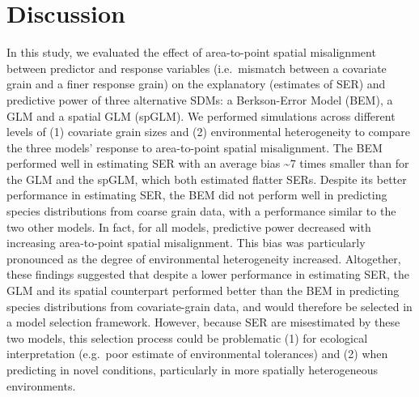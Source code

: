 \documentclass[
  12pt,
  a4paper]{article}
\begin{document}
\hypertarget{discussion}{%
\section{Discussion}\label{discussion}}

In this study, we evaluated the effect of area-to-point spatial misalignment between predictor and response variables (i.e.~mismatch between a covariate grain and a finer response grain) on the explanatory (estimates of SER) and predictive power of three alternative SDMs: a Berkson-Error Model (BEM), a GLM and a spatial GLM (spGLM). We performed simulations across different levels of (1) covariate grain sizes and (2) environmental heterogeneity to compare the three models' response to area-to-point spatial misalignment. The BEM performed well in estimating SER with an average bias \textasciitilde7 times smaller than for the GLM and the spGLM, which both estimated flatter SERs. Despite its better performance in estimating SER, the BEM did not perform well in predicting species distributions from coarse grain data, with a performance similar to the two other models. In fact, for all models, predictive power decreased with increasing area-to-point spatial misalignment. This bias was particularly pronounced as the degree of environmental heterogeneity increased. Altogether, these findings suggested that despite a lower performance in estimating SER, the GLM and its spatial counterpart performed better than the BEM in predicting species distributions from covariate-grain data, and would therefore be selected in a model selection framework. However, because SER are misestimated by these two models, this selection process could be problematic (1) for ecological interpretation (e.g.~poor estimate of environmental tolerances) and (2) when predicting in novel conditions, particularly in more spatially heterogeneous environments.
\end{document}
